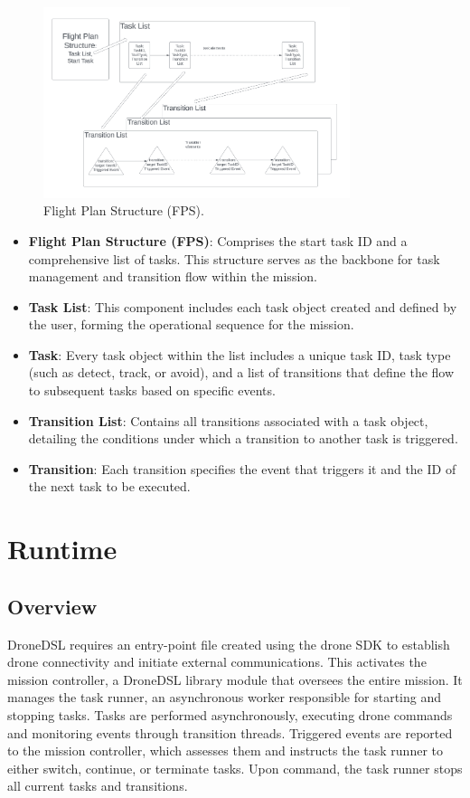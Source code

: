 \begin{figure}[H] %
    \centering %
    \includegraphics[width=0.8\textwidth]{Pictures/cli_auto.PNG}
    \caption{Flight Plan Structure (FPS).}
    \label{fig:cli_auto}
\end{figure}

\begin{itemize}
    \item \textbf{Flight Plan Structure (FPS)}: Comprises the start task ID and a comprehensive list of tasks. This structure serves as the backbone for task management and transition flow within the mission.
    \item \textbf{Task List}: This component includes each task object created and defined by the user, forming the operational sequence for the mission.
    \item \textbf{Task}: Every task object within the list includes a unique task ID, task type (such as detect, track, or avoid), and a list of transitions that define the flow to subsequent tasks based on specific events.
    \item \textbf{Transition List}: Contains all transitions associated with a task object, detailing the conditions under which a transition to another task is triggered.
    \item \textbf{Transition}: Each transition specifies the event that triggers it and the ID of the next task to be executed.
\end{itemize}


\section{Runtime}
\subsection{Overview}
DroneDSL requires an entry-point file created using the drone SDK to establish drone connectivity and initiate external communications. This activates the mission controller, a DroneDSL library module that oversees the entire mission. It manages the task runner, an asynchronous worker responsible for starting and stopping tasks. Tasks are performed asynchronously, executing drone commands and monitoring events through transition threads. Triggered events are reported to the mission controller, which assesses them and instructs the task runner to either switch, continue, or terminate tasks. Upon command, the task runner stops all current tasks and transitions.


